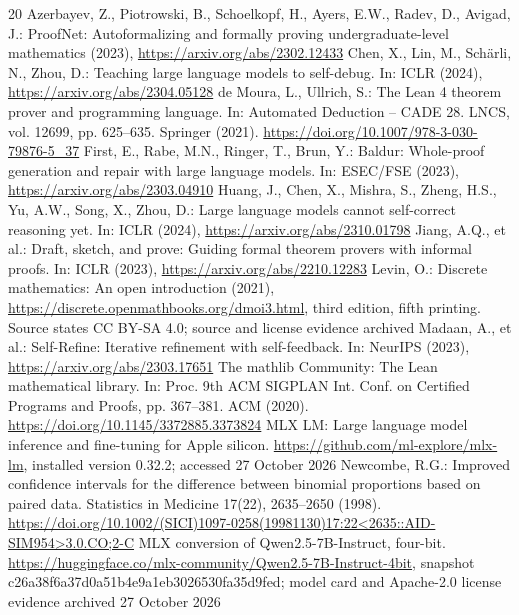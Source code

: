 \documentclass[runningheads,a4paper]{llncs}
\providecommand{\doi}[1]{\url{https://doi.org/#1}}
\begin{document}
\begin{thebibliography}{20}
 Azerbayev, Z., Piotrowski, B., Schoelkopf, H., Ayers, E.W., Radev, D., Avigad, J.: ProofNet: Autoformalizing and formally proving undergraduate-level mathematics (2023), \url{https://arxiv.org/abs/2302.12433}
 Chen, X., Lin, M., Sch{\"a}rli, N., Zhou, D.: Teaching large language models to self-debug. In: ICLR (2024), \url{https://arxiv.org/abs/2304.05128}
 de Moura, L., Ullrich, S.: The Lean 4 theorem prover and programming language. In: Automated Deduction -- CADE 28. LNCS, vol. 12699, pp. 625--635. Springer (2021). \doi{10.1007/978-3-030-79876-5_37}
 First, E., Rabe, M.N., Ringer, T., Brun, Y.: Baldur: Whole-proof generation and repair with large language models. In: ESEC/FSE (2023), \url{https://arxiv.org/abs/2303.04910}
 Huang, J., Chen, X., Mishra, S., Zheng, H.S., Yu, A.W., Song, X., Zhou, D.: Large language models cannot self-correct reasoning yet. In: ICLR (2024), \url{https://arxiv.org/abs/2310.01798}
 Jiang, A.Q., et al.: Draft, sketch, and prove: Guiding formal theorem provers with informal proofs. In: ICLR (2023), \url{https://arxiv.org/abs/2210.12283}
 Levin, O.: Discrete mathematics: An open introduction (2021), \url{https://discrete.openmathbooks.org/dmoi3.html}, third edition, fifth printing. Source states CC BY-SA 4.0; source and license evidence archived
 Madaan, A., et al.: Self-Refine: Iterative refinement with self-feedback. In: NeurIPS (2023), \url{https://arxiv.org/abs/2303.17651}
 The mathlib Community: The Lean mathematical library. In: Proc. 9th ACM SIGPLAN Int. Conf. on Certified Programs and Proofs, pp. 367--381. ACM (2020). \doi{10.1145/3372885.3373824}
 MLX LM: Large language model inference and fine-tuning for Apple silicon. \url{https://github.com/ml-explore/mlx-lm}, installed version 0.32.2; accessed 27 October 2026
 Newcombe, R.G.: Improved confidence intervals for the difference between binomial proportions based on paired data. Statistics in Medicine 17(22), 2635--2650 (1998). \doi{10.1002/(SICI)1097-0258(19981130)17:22<2635::AID-SIM954>3.0.CO;2-C}
 MLX conversion of Qwen2.5-7B-Instruct, four-bit. \url{https://huggingface.co/mlx-community/Qwen2.5-7B-Instruct-4bit}, snapshot c26a38f6a37d0a51b4e9a1eb3026530fa35d9fed; model card and Apache-2.0 license evidence archived 27 October 2026

\end{thebibliography}
\end{document}
